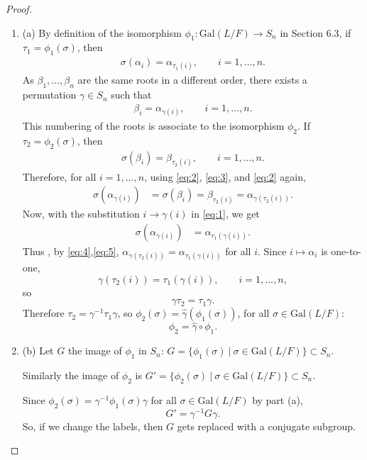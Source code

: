\documentclass[11pt,a4paper]{article}
\newcommand{\be} {\begin{enumerate}}
\newcommand{\ee} {\end{enumerate}}
\newcommand{\Gal}{\mathrm{Gal}}
\begin{document}
\begin{proof}
\be
\item[(a)]
By definition of the isomorphism $\phi_1 : \Gal(L/F) \to S_n$ in Section 6.3, if $\tau_1 = \phi_1(\sigma)$, then 
\begin{align}
\sigma(\alpha_i) = \alpha_{\tau_1(i)},\qquad i=1,\ldots,n.\label{eq:1}
\end{align}
As $\beta_1,\ldots,\beta_n$ are the same roots in a different order, there exists a permutation $\gamma \in S_n$ such that
\begin{align}
\beta_i = \alpha_{\gamma(i)},\qquad i=1,\ldots,n.\label{eq:2}
\end{align}
This numbering of the roots is associate to the isomorphism $\phi_2$. If $\tau_2 = \phi_2(\sigma)$, then 
\begin{align}
\sigma(\beta_i) = \beta_{\tau_2(i)}, \qquad i=1,\ldots,n.\label{eq:3}
\end{align}
Therefore, for all $i=1,\ldots,n$, using \eqref{eq:2}, \eqref{eq:3}, and \eqref{eq:2} again,
\begin{align}
\sigma(\alpha_{\gamma(i)} )&= \sigma(\beta_i)  = \beta_{\tau_2(i)} = \alpha_{\gamma(\tau_2(i))}.\label{eq:4}
\end{align}
Now, with the substitution $i \to \gamma(i)$ in \eqref{eq:1}, we get
\begin{align}
\sigma(\alpha_{\gamma(i)}) &= \alpha_{\tau_1(\gamma(i))}.\label{eq:5}
\end{align}
Thus , by \eqref{eq:4},\eqref{eq:5}, $\alpha_{\gamma(\tau_2(i))} = \alpha_{\tau_1(\gamma(i))}$ for all $i$. Since $i \mapsto \alpha_i$ is one-to-one,
$$\gamma(\tau_2(i)) = \tau_1(\gamma(i)),\qquad i=1,\ldots,n,$$
so
$$\gamma  \tau_2 = \tau_1 \gamma.$$
Therefore $\tau_2 = \gamma^{-1} \tau_1 \gamma$, so  $\phi_2(\sigma) = \hat{\gamma}(\phi_1(\sigma))$, for all $\sigma \in \Gal(L/F)$:
$$\phi_2 = \hat{\gamma} \circ \phi_1.$$
\item[(b)] Let $G$ the image of $\phi_1$ in $S_n$: $G = \{\phi_1(\sigma)\ | \ \sigma \in \Gal(L/F)\} \subset S_n$. 

Similarly the image of $\phi_2$ is $G' = \{\phi_2(\sigma)\ | \ \sigma \in \Gal(L/F)\} \subset S_n$. 

Since $\phi_2(\sigma) = \gamma^{-1} \phi_1(\sigma) \gamma$ for all $\sigma \in \Gal(L/F)$ by part (a),
$$G' = \gamma^{-1} G \gamma.$$
So, if we change the labels, then $G$ gets replaced with a conjugate subgroup.
\ee
\end{proof}
\end{document}

